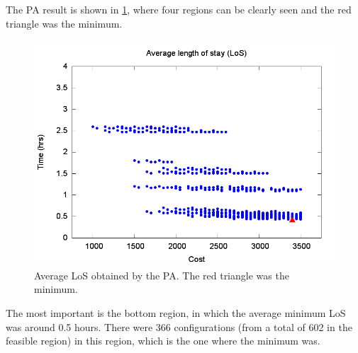 \documentclass[11pt]{article} %
\begin{document}
The PA result is shown in \ref{subfig:pipe4-1}, where four regions
can be clearly seen and the red triangle was the minimum. 
\begin{figure}[H]
\noindent \begin{centering}
\includegraphics[width=0.95\columnwidth,height=0.23\paperheight]{figs4/v0/6400-602-25-pipe-LoS-min}
\par\end{centering}

\caption{Average LoS obtained by the PA. The red triangle was the minimum.
\label{subfig:pipe4-1}}
\end{figure}
The most important is the bottom region, in which the average minimum
LoS was around 0.5 hours. There were 366 configurations (from a total
of 602 in the feasible region) in this region, which is the one where
the minimum was.
\end{document}
